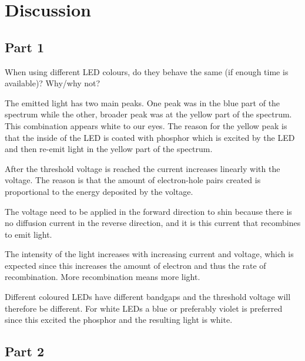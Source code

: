 \section{Discussion}
\subsection{Part 1}
When using different LED colours, do they behave the same (if enough time is available)?
Why/why not?

The emitted light has two main peaks. One peak was in the blue part of the spectrum while the other, broader peak was at the yellow part of the spectrum. This combination appears white to our eyes. The reason for the yellow peak is that the inside of the LED is coated with phosphor which is excited by the LED and then re-emit light in the yellow part of the spectrum.

After the threshold voltage is reached the current increases linearly with the voltage. The reason is that the amount of electron-hole pairs created is proportional to the energy deposited by the voltage.

The voltage need to be applied in the forward direction to shin because there is no diffusion current in the reverse direction, and it is this current that recombines to emit light.

The intensity of the light increases with increasing current and voltage, which is expected since this increases the amount of electron and thus the rate of recombination. More recombination means more light.

Different coloured LEDs have different bandgaps and the threshold voltage will therefore be different. For white LEDs a blue or preferably violet is preferred since this excited the phosphor and the resulting light is white.



\subsection{Part 2}